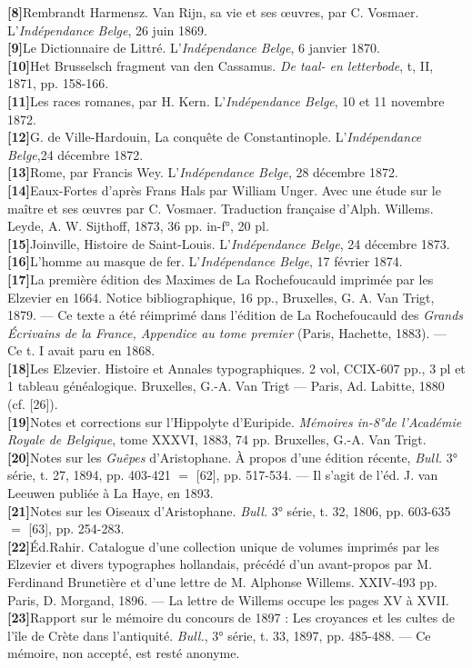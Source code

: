 \documentclass{book}%
\newcommand{\italique}[1]{\textit{#1}}%
\newcommand{\biblio}[2]{\hspace*{-1.5cm}\textbf{[#1]}\hspace*{1.5cm}#2\\

}
\begin{document}
\biblio{8}{Rembrandt Harmensz. Van Rijn, sa vie et ses œuvres, par C. Vosmaer. L'\italique{Indépendance Belge}, 26 juin 1869.}%
\biblio{9}{Le Dictionnaire de Littré. L'\italique{Indépendance Belge}, 6 janvier 1870.}%
\biblio{10}{Het Brusselsch fragment van den Cassamus. \italique{De taal- en letterbode}, t, II, 1871, pp. 158-166.}%
\biblio{11}{Les races romanes, par H. Kern. L'\italique{Indépendance Belge}, 10 et 11 novembre 1872.}%
\biblio{12}{G. de Ville-Hardouin, La conquête de Constantinople. L'\italique{Indépendance Belge},24 décembre 1872.}%
\biblio{13}{Rome, par Francis Wey. L'\italique{Indépendance Belge}, 28 décembre 1872.}%
\biblio{14}{Eaux-Fortes d'après Frans Hals par William Unger. Avec une étude sur le maître et ses œuvres par C. Vosmaer. Traduction française d'Alph. Willems. Leyde, A. W. Sijthoff, 1873, 36 pp. in-f°, 20 pl.}%
\biblio{15}{Joinville, Histoire de Saint-Louis. L'\italique{Indépendance Belge}, 24 décembre 1873.}%
\biblio{16}{L'homme au masque de fer. L'\italique{Indépendance Belge}, 17 février 1874.}%
\biblio{17}{La première édition des Maximes de La Rochefoucauld imprimée par les Elzevier en 1664. Notice bibliographique, 16 pp., Bruxelles, G. A. Van Trigt, 1879. — Ce texte a été réimprimé dans l'édition de La Rochefoucauld des \italique{Grands Écrivains de la France, Appendice au tome premier} (Paris, Hachette, 1883). — Ce t. I avait paru en 1868.}%
\biblio{18}{Les Elzevier. Histoire et Annales typographiques. 2 vol, CCIX-607 pp., 3 pl et 1 tableau généalogique. Bruxelles, G.-A. Van Trigt — Paris, Ad. Labitte, 1880 (cf. [26]).}%
\biblio{19}{Notes et corrections sur l'Hippolyte d'Euripide. \italique{Mémoires in-8°de l'Académie Royale de Belgique}, tome XXXVI, 1883, 74 pp. Bruxelles, G.-A. Van Trigt.}%
\biblio{20}{Notes sur les \italique{Guêpes} d'Aristophane. À propos d'une édition récente, \italique{Bull.} 3° série, t. 27, 1894, pp. 403-421 $=$ [62], pp. 517-534. — Il s'agit de l'éd. J. van Leeuwen publiée à La Haye, en 1893.}%
\biblio{21}{Notes sur les Oiseaux d'Aristophane. \italique{Bull.} 3° série, t. 32, 1806, pp. 603-635 $=$ [63], pp. 254-283.}%
\biblio{22}{Éd.Rahir. Catalogue d'une collection unique de volumes imprimés par les Elzevier et divers typographes hollandais, précédé d'un avant-propos par M. Ferdinand Brunetière et d'une lettre de M. Alphonse Willems. XXIV-493 pp. Paris, D. Morgand, 1896. — La lettre de Willems occupe les pages XV à XVII.}%
\biblio{23}{Rapport sur le mémoire du concours de 1897 : Les croyances et les cultes de l'île de Crète dans l'antiquité. \italique{Bull.}, 3° série, t. 33, 1897, pp. 485-488. — Ce mémoire, non accepté, est resté anonyme.}%
\end{document}
